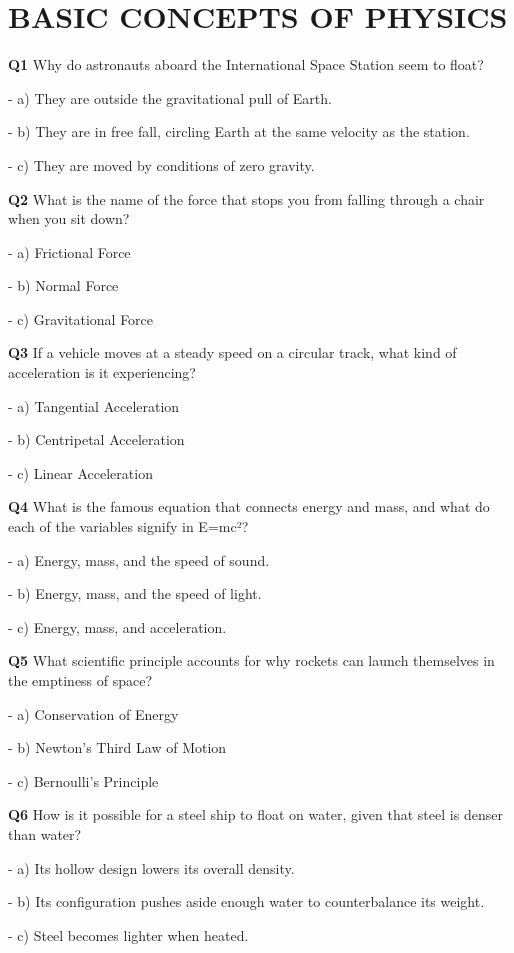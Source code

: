 \section{BASIC CONCEPTS OF PHYSICS}

\textbf{Q1} Why do astronauts aboard the International Space Station seem to float?\par
\quad - a) They are outside the gravitational pull of Earth.\par
\quad - b) They are in free fall, circling Earth at the same velocity as the station.\par
\quad - c) They are moved by conditions of zero gravity.\par

\textbf{Q2} What is the name of the force that stops you from falling through a chair when you sit down?\par
\quad - a) Frictional Force\par
\quad - b) Normal Force\par
\quad - c) Gravitational Force\par

\textbf{Q3} If a vehicle moves at a steady speed on a circular track, what kind of acceleration is it experiencing?\par
\quad - a) Tangential Acceleration\par
\quad - b) Centripetal Acceleration\par
\quad - c) Linear Acceleration\par

\textbf{Q4} What is the famous equation that connects energy and mass, and what do each of the variables signify in E=mc²?\par
\quad - a) Energy, mass, and the speed of sound.\par
\quad - b) Energy, mass, and the speed of light.\par
\quad - c) Energy, mass, and acceleration.\par

\textbf{Q5} What scientific principle accounts for why rockets can launch themselves in the emptiness of space?\par
\quad - a) Conservation of Energy\par
\quad - b) Newton's Third Law of Motion\par
\quad - c) Bernoulli's Principle\par

\textbf{Q6} How is it possible for a steel ship to float on water, given that steel is denser than water?\par
\quad - a) Its hollow design lowers its overall density.\par
\quad - b) Its configuration pushes aside enough water to counterbalance its weight.\par
\quad - c) Steel becomes lighter when heated.\par

